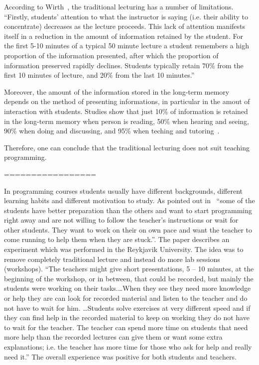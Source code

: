 \documentclass{article}
\begin{document}
According to Wirth~\cite{wirth}, the traditional lecturing has a
number of limitations.  ``Firstly, students’ attention to what the
instructor is saying (i.e. their ability to concentrate) decreases as
the lecture proceeds. This lack of attention manifests itself in a
reduction in the amount of information retained by the student. For
the first 5-10 minutes of a typical 50 minute lecture a student
remembers a high proportion of the information presented, after which
the proportion of information preserved rapidly declines. Students
typically retain 70\% from the first 10 minutes of lecture, and 20\%
from the last 10 minutes.''

Moreover, the amount of the information stored in the long-term memory
depends on the method of presenting informations, in particular in the
amout of interaction with students.  Studies show that just 10\% of
information  is retained in the long-term memory when person is
reading, 50\% when hearing and seeing, 90\% when doing and discussing,
and 95\% when teching and tutoring~\cite{magnesen}.

Therefore, one can conclude that the traditional lecturing does not
suit teaching programming.

=================


In programming courses students usually have different backgrounds,
different learning habits and different motivation to study. As
pointed out in~\cite{experiment_iceland_2006} ``some of the students
have better preparation than the others and want to start programming
right away and are not willing to follow the teacher’s instructions or
wait for other students. They want to work on their on own pace and
want the teacher to come running to help them when they are stuck.''.
The paper describes an experiment which was performed in the Reykjavik
University. The idea was to remove completely traditional lecture and
instead do more lab sessions (workshops). ``The teachers might give
short presentations, 5 – 10 minutes, at the beginning of the workshop,
or in between, that could be recorded, but mainly the students were
working on their tasks.\ldots When they see they need more knowledge
or help they are can look for recorded material and listen to the
teacher and do not have to wait for him. \ldots Students solve
exercises at very different speed and if they can find help in the
recorded material to keep on working they do not have to wait for the
teacher. The teacher can spend more time on students that need more
help than the recorded lectures can give them or want some extra
explanations; i.e. the teacher has more time for those who ask for
help and really need it.'' The overall experience was positive for
both students and teachers.
\end{document}
